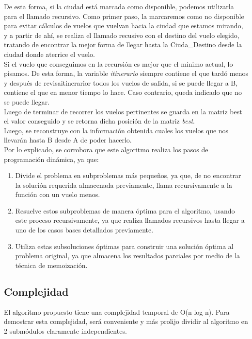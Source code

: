 \documentclass[10pt,a4paper]{article}
\begin{document}
De esta forma, si la ciudad está marcada como disponible, podemos utilizarla para el llamado recursivo. Como primer paso, la marcaremos como no disponible para evitar cálculos de vuelos que vuelvan hacia la ciudad que estamos mirando, y a partir de ahí, se realiza el llamado recusivo con el destino del vuelo elegido, tratando de encontrar la mejor forma de llegar hasta la Ciuda\_Destino desde la ciudad donde aterrice el vuelo.\\

Si el vuelo que conseguimos en la recursión es mejor que el mínimo actual, lo pisamos. De esta forma, la variable \textit{itinerario} siempre contiene el que tardó menos y después de revisaitinerarior todos los vuelos de salida, si se puede llegar a B, contiene el que en menor tiempo lo hace. Caso contrario, queda indicado que no se puede llegar.\\

Luego de terminar de recorrer los vuelos pertinentes se guarda en la matriz best el valor conseguido  y se retorna dicha posición de la matriz \textit{best}.\\

Luego, se reconstruye con la información obtenida cuales los vuelos que nos llevarán hasta B desde A de poder hacerlo.\\

\newpage
Por lo explicado, se corrobora que este algoritmo realiza los pasos de programación dinámica, ya que:\\

\begin{enumerate}
\item Divide el problema en subproblemas más pequeños, ya que, de no encontrar la solución requerida almacenada previamente, llama recursivamente a la función con un vuelo menos.

\item Resuelve estos subproblemas de manera óptima para el algoritmo, usando este proceso recursivamente, ya que realiza llamados recursivos hasta llegar a uno de los casos bases detallados previamente.

\item Utiliza estas subsoluciones óptimas para construir una solución óptima al problema original, ya que almacena los resultados parciales por medio de la técnica de memoización.

\end{enumerate}



\newpage
\subsection{Complejidad}
\noindent El algoritmo propuesto tiene una complejidad temporal de O(n log n). Para demostrar esta complejidad, será conveniente y más prolijo dividir al algoritmo en 2 submódulos claramente independientes.
\end{document}
